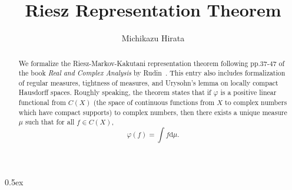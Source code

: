 \documentclass[11pt,a4paper]{article}
\begin{document}
\title{Riesz Representation Theorem}
\author{Michikazu Hirata}
\maketitle
\begin{abstract}
  We formalize the Riesz-Markov-Kakutani representation theorem following pp.37-47 of the book \textit{Real and Complex Analysis} by Rudin~\cite{Rudin}.
  This entry also includes formalization of regular measures, tightness of measures, and Urysohn's lemma on locally compact Hausdorff spaces.
  Roughly speaking, the theorem states that
  if $\varphi$ is a positive linear functional from $C(X)$ (the space of continuous functions from $X$ to complex numbers which have compact supports) to complex numbers,
  then there exists a unique measure $\mu$ such that for all $f\in C(X)$, \[\varphi(f) = \int f \mathrm{d}\mu.\]
\end{abstract}

\tableofcontents

\parindent 0pt\parskip 0.5ex





\end{document}

